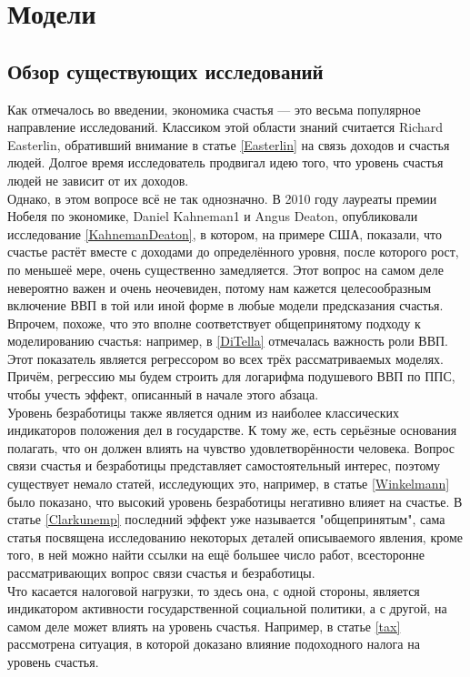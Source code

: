 \documentclass[russian]{vegareport}
\begin{document}
    \chapter{Модели}
        \section{Обзор существующих исследований}
        Как отмечалось во введении, экономика счастья --- это весьма популярное направление исследований. Классиком этой области знаний считается Richard Easterlin, обративший внимание в статье \ref{Easterlin} на связь доходов и счастья людей. Долгое время исследователь продвигал идею того, что уровень счастья людей не зависит от их доходов.
        \\
        Однако, в этом вопросе всё не так однозначно. В 2010 году лауреаты премии Нобеля по экономике, Daniel Kahneman1 и Angus Deaton, опубликовали исследование \ref{KahnemanDeaton}, в котором, на примере США, показали, что счастье растёт вместе с доходами до определённого уровня, после которого рост, по меньшеё мере, очень существенно замедляется. Этот вопрос на самом деле невероятно важен и очень неочевиден, потому нам кажется целесообразным включение ВВП в той или иной форме в любые модели предсказания счастья. Впрочем, похоже, что это вполне соответствует общепринятому подходу к моделированию счастья: например, в \ref{DiTella} отмечалась важность роли ВВП. Этот показатель является регрессором во всех трёх рассматриваемых моделях. Причём, регрессию мы будем строить для логарифма подушевого ВВП по ППС, чтобы учесть эффект, описанный в начале этого абзаца.
        \\
        Уровень безработицы также является одним из наиболее классических индикаторов положения дел в государстве. К тому же, есть серьёзные основания полагать, что он должен влиять на чувство удовлетворённости человека. Вопрос связи счастья и безработицы представляет самостоятельный интерес, поэтому существует немало статей, исследующих это, например, в статье \ref{Winkelmann} было показано, что высокий уровень безработицы негативно влияет на счастье. В статье \ref{Clarkunemp} последний эффект уже называется "общепринятым", сама статья посвящена исследованию некоторых деталей описываемого явления, кроме того, в ней можно найти ссылки на ещё большее число работ, всесторонне рассматривающих вопрос связи счастья и безработицы.
        \\
        Что касается налоговой нагрузки, то здесь она, с одной стороны, является индикатором активности государственной социальной политики, а с другой, на самом деле может влиять на уровень счастья. Например, в статье \ref{tax} рассмотрена ситуация, в которой доказано влияние подоходного налога на уровень счастья.
\end{document}
